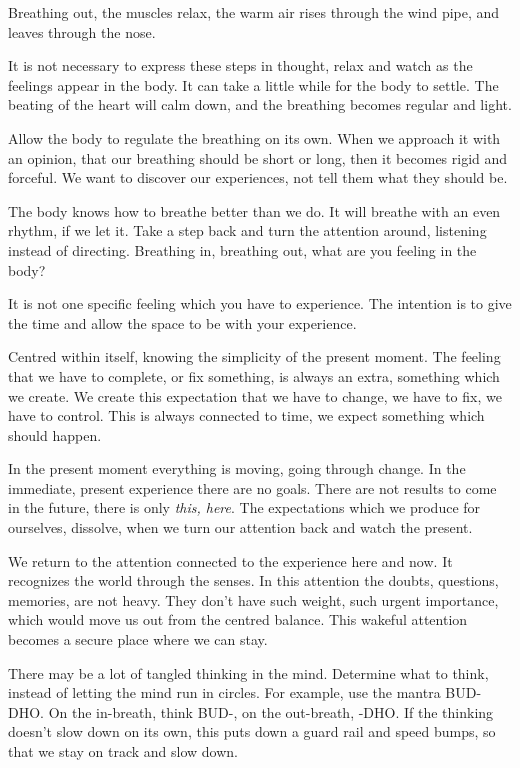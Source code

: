 Breathing out, the muscles relax, the warm air rises through the wind
pipe, and leaves through the nose.

It is not necessary to express these steps in thought, relax and watch
as the feelings appear in the body. It can take a little while for the
body to settle. The beating of the heart will calm down, and the
breathing becomes regular and light.

Allow the body to regulate the breathing on its own. When we approach it
with an opinion, that our breathing should be short or long, then it
becomes rigid and forceful. We want to discover our experiences, not
tell them what they should be.

The body knows how to breathe better than we do. It will breathe with an
even rhythm, if we let it. Take a step back and turn the attention
around, listening instead of directing. Breathing in, breathing out,
what are you feeling in the body?

It is not one specific feeling which you have to experience. The
intention is to give the time and allow the space to be with your
experience.

Centred within itself, knowing the simplicity of the present moment. The
feeling that we have to complete, or fix something, is always an extra,
something which we create. We create this expectation that we have to
change, we have to fix, we have to control. This is always connected to
time, we expect something which should happen.

In the present moment everything is moving, going through change. In the
immediate, present experience there are no goals. There are not results
to come in the future, there is only \emph{this, here}. The expectations
which we produce for ourselves, dissolve, when we turn our attention
back and watch the present.

We return to the attention connected to the experience here and now. It
recognizes the world through the senses. In this attention the doubts,
questions, memories, are not heavy. They don't have such weight, such
urgent importance, which would move us out from the centred balance.
This wakeful attention becomes a secure place where we can stay.

There may be a lot of tangled thinking in the mind. Determine what to
think, instead of letting the mind run in circles. For example, use the
mantra BUD-DHO. On the in-breath, think BUD-, on the out-breath, -DHO.
If the thinking doesn't slow down on its own, this puts down a guard
rail and speed bumps, so that we stay on track and slow down.

